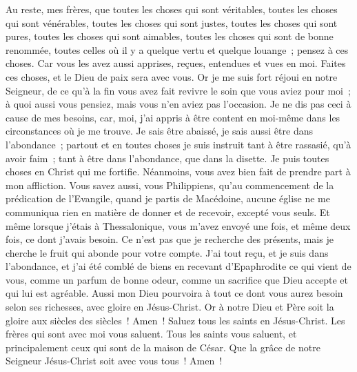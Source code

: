 \begin{multicols}{2}
 Au reste, mes frères, que toutes les choses qui sont véritables, toutes les choses qui sont vénérables, toutes les choses qui sont justes, toutes les choses qui sont pures, toutes les choses qui sont aimables, toutes les choses qui sont de bonne renommée, toutes celles où il y a quelque vertu et quelque louange~; pensez à ces choses.
Car vous les avez aussi apprises, reçues, entendues et vues en moi. Faites ces choses, et le Dieu de paix sera avec vous. 
Or je me suis fort réjoui en notre Seigneur, de ce qu'à la fin vous avez fait revivre le soin que vous aviez pour moi~; à quoi aussi vous pensiez, mais vous n'en aviez pas l'occasion. 
Je ne dis pas ceci à cause de mes besoins, car, moi, j'ai appris à être content en moi-même dans les circonstances où je me trouve.
Je sais être abaissé, je sais aussi être dans l'abondance~; partout et en toutes choses je suis instruit tant à être rassasié, qu'à avoir faim~; tant à être dans l'abondance, que dans la disette.
Je puis toutes choses en Christ qui me fortifie.
Néanmoins, vous avez bien fait de prendre part à mon affliction.
Vous savez aussi, vous Philippiens, qu'au commencement de la prédication de l'Evangile, quand je partis de Macédoine, aucune église ne me communiqua rien en matière de donner et de recevoir, excepté vous seuls. 
Et même lorsque j'étais à Thessalonique, vous m'avez envoyé une fois, et même deux fois, ce dont j'avais besoin. 
Ce n'est pas que je recherche des présents, mais je cherche le fruit qui abonde pour votre compte.
J'ai tout reçu, et je suis dans l'abondance, et j'ai été comblé de biens en recevant d'Epaphrodite ce qui vient de vous, comme un parfum de bonne odeur, comme un sacrifice que Dieu accepte et qui lui est agréable.
Aussi mon Dieu pourvoira à tout ce dont vous aurez besoin selon ses richesses, avec gloire en Jésus-Christ. 
Or à notre Dieu et Père soit la gloire aux siècles des siècles~! Amen~!
Saluez tous les saints en Jésus-Christ. Les frères qui sont avec moi vous saluent.
Tous les saints vous saluent, et principalement ceux qui sont de la maison de César.
Que la grâce de notre Seigneur Jésus-Christ soit avec vous tous~! Amen~!
\PPE{}
\end{multicols}
